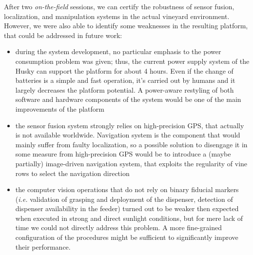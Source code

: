After two \textit{on-the-field} sessions, we can certify the robustness of sensor fusion, localization, and manipulation systems in the actual vineyard environment. However, we were also able to identify some weaknesses in the resulting platform, that could be addressed in future work:
\begin{itemize}
	\item during the system development, no particular emphasis to the power consumption problem was given; thus, the current power supply system of the Husky can support the platform for about 4 hours. Even if the change of batteries is a simple and fast operation, it's carried out by humans and it largely decreases the platform potential. A power-aware restyling of both software and hardware components of the system would be one of the main improvements of the platform
	\item the sensor fusion system strongly relies on high-precision GPS, that actually is not available worldwide. Navigation system is the component that would mainly suffer from faulty localization, so a possible solution to disengage it in some measure from high-precision GPS would be to introduce a (maybe partially) image-driven navigation system, that exploits the regularity of vine rows to select the navigation direction
	\item the computer vision operations that do not rely on binary fiducial markers (\textit{i.e.} validation of grasping and deployment of the dispenser, detection of dispenser availability in the feeder) turned out to be weaker then expected when executed in strong and direct sunlight conditions, but for mere lack of time we could not directly address this problem. A more fine-grained configuration of the procedures might be sufficient to significantly improve their performance.
\end{itemize}





